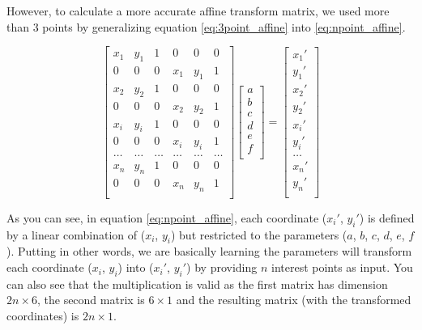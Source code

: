 \documentclass[]{IEEEtran}
\begin{document}
However, to calculate a more accurate affine transform matrix, we used more than 3 points by generalizing equation \ref{eq:3point_affine} into \ref{eq:npoint_affine}.

\begin{equation} \label{eq:npoint_affine}
\begin{bmatrix}
    x_1 & y_1 & 1 & 0 & 0 & 0 \\
    0 & 0 & 0 & x_1 & y_1 & 1 \\
    x_2 & y_2 & 1 & 0 & 0 & 0 \\
    0 & 0 & 0 & x_2 & y_2 & 1 \\
    x_i & y_i & 1 & 0 & 0 & 0 \\
    0 & 0 & 0 & x_i & y_i & 1 \\
    \dots & \dots & \dots & \dots & \dots & \dots  \\
     x_n & y_n & 1 & 0 & 0 & 0 \\
    0 & 0 & 0 & x_n & y_n & 1 \\
\end{bmatrix}
\begin{bmatrix}
   a \\
   b \\
   c \\
   d \\
   e \\
   f \\
\end{bmatrix}
=
\begin{bmatrix}
   x_1' \\
   y_1' \\
   x_2' \\
   y_2' \\
   x_i' \\
   y_i' \\
   \dots \\
   x_n' \\
   y_n' \\
\end{bmatrix}
\end{equation}

As you can see, in equation \ref{eq:npoint_affine}, each coordinate ($x_i'$, $y_i'$) is defined by a linear combination of ($x_i$, $y_i$) but restricted to the parameters ($a$, $b$, $c$, $d$, $e$, $f$). Putting in other words, we are basically learning the parameters will transform each coordinate ($x_i$, $y_i$) into ($x_i'$, $y_i'$) by providing $n$ interest points as input. You can also see that the multiplication is valid as the first matrix has dimension $2n \times 6$, the second matrix is $6 \times 1$ and the resulting matrix (with the transformed coordinates) is $2n \times 1$.
\end{document}
